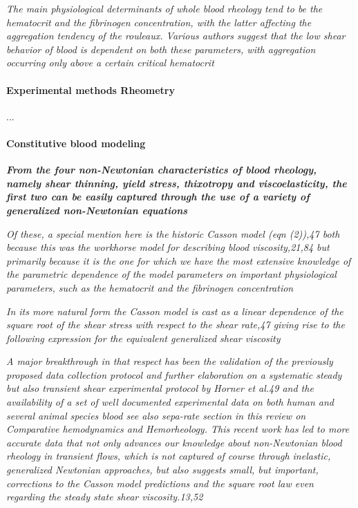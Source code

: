\documentclass[11pt,letterpaper]{article}
\begin{document}
\textit{The main physiological determinants of whole blood rheology
tend to be the hematocrit and the fibrinogen concentration, with the latter affecting the aggregation tendency of the rouleaux. Various authors suggest that the low shear behavior of blood is dependent on both these parameters, with aggregation occurring only above a certain critical hematocrit}


\paragraph{Experimental methods
Rheometry}...

\paragraph{Constitutive blood modeling}

{\color{blue}
\textbf{\textit{ From the four non-Newtonian characteristics of blood rheology,
namely shear thinning, yield stress, thixotropy and viscoelasticity, the first two can be easily captured through the use of a variety of generalized non-Newtonian equations}}}

\textit{Of these, a special mention here is the historic Casson model (eqn (2)),47 both because this was the workhorse model for describing blood viscosity,21,84 but primarily because it is the one for which we have the most extensive knowledge of the parametric dependence of the model parameters on important physiological parameters, such as the hematocrit and the fibrinogen concentration}

\textit{In its more natural form the Casson model is cast as a linear dependence of the square root of the shear stress with respect to the shear rate,47 giving rise to the following expression for the equivalent generalized shear viscosity}

\textit{
A major breakthrough in that respect has
been the validation of the previously proposed data collection
protocol and further elaboration on a systematic steady but
also transient shear experimental protocol by Horner et al.49 and
the availability of a set of well documented experimental data on
both human and several animal species blood see also sepa-rate section in this review on Comparative hemodynamics and
Hemorheology. This recent work has led to more accurate data
that not only advances our knowledge about non-Newtonian
blood rheology in transient flows, which is not captured of course
through inelastic, generalized Newtonian approaches, but also
suggests small, but important, corrections to the Casson model
predictions and the square root law even regarding the steady
state shear viscosity.13,52}
\end{document}
